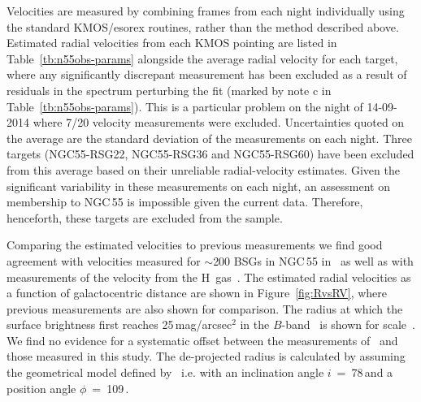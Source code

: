 Velocities are measured by combining frames from each night individually using the standard KMOS/esorex routines, rather than the method described above.
Estimated radial velocities from each KMOS pointing are listed in Table~\ref{tb:n55obs-params} alongside the average radial velocity for each target, where any significantly discrepant measurement has been excluded as a result of residuals in the spectrum perturbing the fit (marked by note c in Table~\ref{tb:n55obs-params}).
This is a particular problem on the night of 14-09-2014 where 7/20 velocity measurements were excluded.
Uncertainties quoted on the average are the standard deviation of the measurements on each night.
Three targets (NGC55-RSG22, NGC55-RSG36 and NGC55-RSG60) have been excluded from this average based on their unreliable radial-velocity estimates.
Given the significant variability in these measurements on each night, an assessment on membership to NGC\,55 is impossible given the current data.
Therefore, henceforth, these targets are excluded from the sample.

Comparing the estimated velocities to previous measurements we find good agreement with velocities measured for $\sim$200 BSGs in NGC\,55 in~\citep{2008A&A...485...41C} as well as with measurements of the velocity from the H\,\1 gas~\citep{1991AJ....101..447P}.
The estimated radial velocities as a function of galactocentric distance are shown in Figure~\ref{fig:RvsRV}, where previous measurements are also shown for comparison.
The radius at which the surface brightness first reaches 25\,mag/arcsec$^2$ in the $B$-band~\citep[R$_{25}$ e.g.][]{2015eaci.book.....S} is shown for scale~\citep[$R_{25}$~=~16.2\,$\pm$\,0.4\,arcmin][]{1991rc3..book.....D}.
We find no evidence for a systematic offset between the measurements of~\cite{2008A&A...485...41C} and those measured in this study.
The de-projected radius is calculated by assuming the geometrical model defined by~\citet{1991AJ....101..447P} i.e. with an inclination angle $i$~=~78\,\textdegree and a position angle $\phi$~=~109\,\textdegree.

